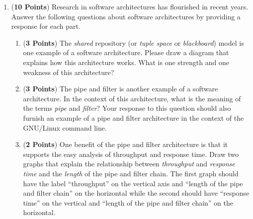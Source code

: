 \documentclass[12pt,epsf,psfig,graphicx]{article}
\begin{document}
\begin{enumerate}
\begin{enumerate}
% 

% 
\end{enumerate}

\newpage

\item ({\bf 10 Points}) Research in software architectures has
  flourished in recent years.  Answer the following questions about
  software architectures by providing a response for each part.

\begin{enumerate}

% 
\item ({\bf 3 Points}) The {\em shared} repository (or {\em tuple
  space} or {\em blackboard}) model is one example of a software
  architecture.  Please draw a diagram that explains how this
  architecture works.  What is one strength and one weakness of this
  architecture?

\item ({\bf 3 Points}) The pipe and filter is another example of a
  software architecture.  In the context of this architecture, what is
  the meaning of the terms {\em pipe} and {\em filter}?  Your response
  to this question should also furnish an example of a pipe and filter
  architecture in the context of the GNU/Linux command line.

\item ({\bf 2 Points}) One benefit of the pipe and filter architecture
  is that it supports the easy analysis of throughput and response
  time.  Draw two graphs that explain the relationship between {\em
    throughput} and {\em response time} and the {\em length} of the
  pipe and filter chain.  The first graph should have the label
  ``throughput'' on the vertical axis and ``length of the pipe and
  filter chain'' on the horizontal while the second should have
  ``response time'' on the vertical and ``length of the pipe and
  filter chain'' on the horizontal.


\end{enumerate}
\end{enumerate}
\end{document}
